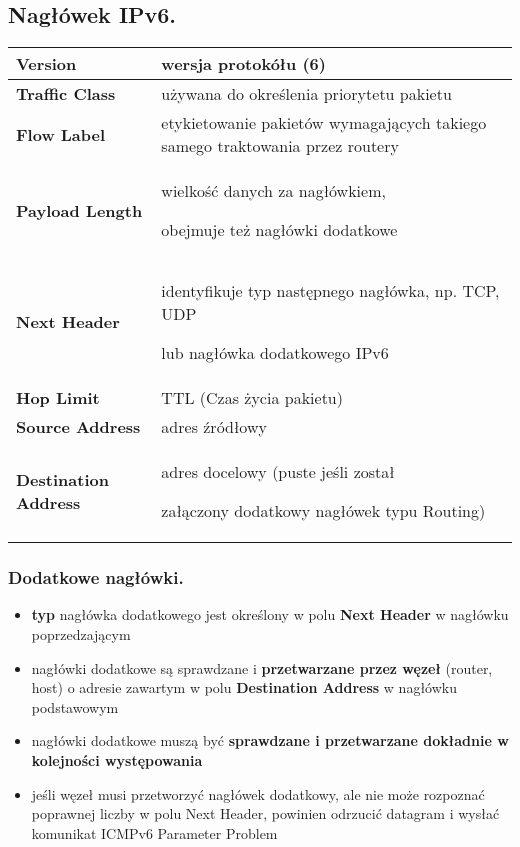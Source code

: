 \documentclass[../main.tex]{subfiles}
\begin{document}
    \subsection{Nagłówek IPv6.}
    \begin{tabularx}{\textwidth}{|l|X|}
        \hline
        \textbf{Version} &
        wersja protokółu (6)\\
        \hline
        \textbf{Traffic Class} &
        używana do określenia priorytetu pakietu\\
        \hline

        \textbf{Flow Label} &
        etykietowanie pakietów wymagających takiego samego
        traktowania przez routery\\
        \hline

        \textbf{Payload Length} &
        wielkość danych za nagłówkiem,

        obejmuje też nagłówki dodatkowe\\
        \hline

        \textbf{Next Header} &
        identyfikuje typ następnego nagłówka, np. TCP, UDP

        lub nagłówka dodatkowego IPv6\\
        \hline

        \textbf{Hop Limit} &
        TTL (Czas życia pakietu)\\
        \hline

        \textbf{Source Address} &
        adres źródłowy\\
        \hline

        \textbf{Destination Address} &
        adres docelowy (puste jeśli został

        załączony dodatkowy nagłówek typu Routing)\\
        \hline
    \end{tabularx}


    \subsubsection{Dodatkowe nagłówki.}
    \begin{itemize}
        \item \textbf{typ} nagłówka dodatkowego jest określony w polu \textbf{Next Header} w nagłówku poprzedzającym
        \item nagłówki dodatkowe są sprawdzane i \textbf{przetwarzane przez węzeł} (router, host) o adresie zawartym w polu \textbf{Destination Address} w nagłówku podstawowym
        \item nagłówki dodatkowe muszą być \textbf{sprawdzane i przetwarzane dokładnie w kolejności występowania}
        \item jeśli węzeł musi przetworzyć nagłówek dodatkowy, ale nie może rozpoznać poprawnej liczby w polu Next Header, powinien odrzucić datagram i wysłać komunikat ICMPv6 Parameter Problem
    \end{itemize}
\end{document}
